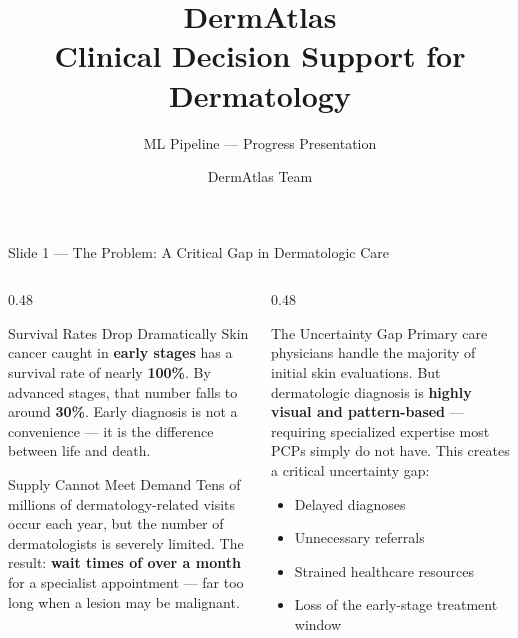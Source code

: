 \documentclass[aspectratio=169, 9pt]{beamer}
\title[DermAtlas ML Pipeline]{\textbf{DermAtlas}\\Clinical Decision Support for Dermatology}
\subtitle{ML Pipeline --- Progress Presentation}
\author{DermAtlas Team}
\date{}
\begin{document}
\begin{frame}
  \titlepage
\end{frame}

\begin{frame}{Slide 1 --- The Problem: A Critical Gap in Dermatologic Care}

  \begin{columns}[T]

    \begin{column}{0.48\textwidth}
      \begin{alertblock}{Survival Rates Drop Dramatically}
        \small
        Skin cancer caught in \textbf{early stages} has a survival
        rate of nearly \textbf{100\%}. By advanced stages, that
        number falls to around \textbf{30\%}. Early diagnosis is
        not a convenience --- it is the difference between life
        and death.
      \end{alertblock}

      \vspace{0.4em}
      \begin{alertblock}{Supply Cannot Meet Demand}
        \small
        Tens of millions of dermatology-related visits occur each
        year, but the number of dermatologists is severely limited.
        The result: \textbf{wait times of over a month} for a
        specialist appointment --- far too long when a lesion
        may be malignant.
      \end{alertblock}
    \end{column}

    \begin{column}{0.48\textwidth}
      \begin{block}{The Uncertainty Gap}
        \small
        Primary care physicians handle the majority of initial
        skin evaluations. But dermatologic diagnosis is
        \textbf{highly visual and pattern-based} --- requiring
        specialized expertise most PCPs simply do not have.
        This creates a critical uncertainty gap:
        \begin{itemize}[leftmargin=1em, itemsep=2pt]
          \item Delayed diagnoses
          \item Unnecessary referrals
          \item Strained healthcare resources
          \item Loss of the early-stage treatment window
        \end{itemize}
      \end{block}


\end{column}
\end{columns}
\end{frame}
\end{document}
